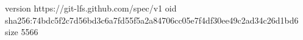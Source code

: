 version https://git-lfs.github.com/spec/v1
oid sha256:74bdc5f2c7d56bd3c6a7fd55f5a2a84706cc05e7f4df30ee49c2ad34c26d1bd6
size 5566
